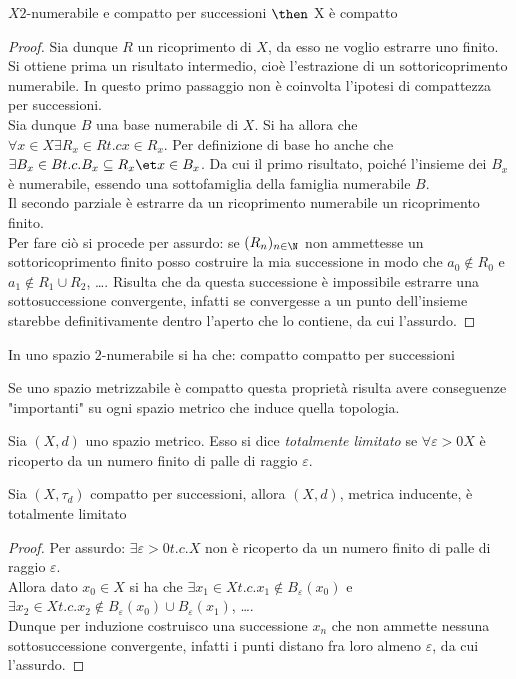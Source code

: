 \begin{prop}
$X 2$-numerabile e compatto per successioni $\then$ X è compatto
\end{prop}
\begin{proof}
Sia dunque $R$ un ricoprimento di $X$, da esso ne voglio estrarre uno finito.\\
Si ottiene prima un risultato intermedio, cioè l'estrazione di un sottoricoprimento numerabile. In questo primo passaggio non è coinvolta l'ipotesi di compattezza per successioni.\\
Sia dunque $B$ una base numerabile di $X$. Si ha allora che $\forall x\in X \exists R_x \in R t.c x\in R_x$. Per definizione di base ho anche che $\exists B_x \in B t.c. B_x \subseteq R_x \et x\in B_x$. Da cui il primo risultato, poiché l'insieme dei $B_x$ è numerabile, essendo una sottofamiglia della famiglia numerabile $B$.\\
Il secondo parziale è estrarre da un ricoprimento numerabile un ricoprimento finito.\\
Per fare ciò si procede per assurdo: se $(R_n)_{n\in \N}$ non ammettesse un sottoricoprimento finito posso costruire la mia successione in modo che $a_0 \not \in R_0$ e $a_1 \not \in R_1 \cup R_2$, \dots . Risulta che da questa successione è impossibile estrarre una sottosuccessione convergente, infatti se convergesse a un punto dell'insieme starebbe definitivamente dentro l'aperto che lo contiene, da cui l'assurdo.
\end{proof}

\begin{cor}
In uno spazio $2$-numerabile si ha che: compatto \iff compatto per successioni
\end{cor}

Se uno spazio metrizzabile è compatto questa proprietà risulta avere conseguenze "importanti" su ogni spazio metrico che induce quella topologia.

\begin{defn}
Sia $(X,d)$ uno spazio metrico. Esso si dice \emph{totalmente limitato} se $\forall \varepsilon > 0 X$ è ricoperto da un numero finito di palle di raggio $\varepsilon$.
\end{defn}

\begin{prop}
Sia $(X,\tau _d)$ compatto per successioni, allora $(X,d)$, metrica inducente, è totalmente limitato
\end{prop}
\begin{proof}
Per assurdo: $\exists \varepsilon > 0 t.c. X$ non è ricoperto da un numero finito di palle di raggio $\varepsilon$.\\
Allora dato $x_0 \in X$ si ha che $\exists x_1 \in X t.c. x_1 \not \in B_\varepsilon (x_0)$ e $\exists x_2 \in X t.c. x_2 \not \in B_\varepsilon (x_0) \cup B_\varepsilon (x_1)$, \dots .\\
Dunque per induzione costruisco una successione $x_n$ che non ammette nessuna sottosuccessione convergente, infatti i punti distano fra loro almeno $\varepsilon$, da cui l'assurdo.
\end{proof}

